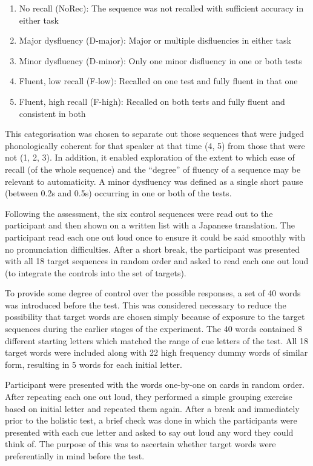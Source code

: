 \documentclass[output=paper]{langscibook}
\begin{document}
\begin{enumerate}
\item No recall (NoRec): The sequence was not recalled with sufficient accuracy in either task
\item Major dysfluency (D-major): Major or multiple disfluencies in either task
\item Minor dysfluency (D-minor): Only one minor disfluency in one or both tests
\item Fluent, low recall (F-low): Recalled on one test and fully fluent in that one
\item Fluent, high recall (F-high): Recalled on both tests and fully fluent and consistent in both
\end{enumerate}

This categorisation was chosen to separate out those sequences that were judged phonologically coherent for that speaker at that time (4, 5) from those that were not (1, 2, 3). In addition, it enabled exploration of the extent to which ease of recall (of the whole sequence) and the ``degree'' of fluency of a sequence may be relevant to automaticity. A minor dysfluency was defined as a single short pause (between 0.2s and 0.5s) occurring in one or both of the tests.

Following the assessment, the six control sequences were read out to the participant and then shown on a written list with a Japanese translation. The participant read each one out loud once to ensure it could be said smoothly with no pronunciation difficulties. After a short break, the participant was presented with all 18 target sequences in random order and asked to read each one out loud (to integrate the controls into the set of targets). 

To provide some degree of control over the possible responses, a set of 40 words was introduced before the test. This was considered necessary to reduce the possibility that target words are chosen simply because of exposure to the target sequences during the earlier stages of the experiment. The 40 words contained 8 different starting letters which matched the range of cue letters of the test. All 18 target words were included along with 22 high frequency dummy words of similar form, resulting in 5 words for each initial letter. 

Participant were presented with the words one-by-one on cards in random order. After repeating each one out loud, they performed a simple grouping exercise based on initial letter and repeated them again. After a break and immediately prior to the holistic test, a brief check was done in which the participants were presented with each cue letter and asked to say out loud any word they could think of. The purpose of this was to ascertain whether target words were preferentially in mind before the test. 
\end{document}
